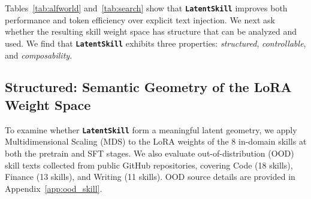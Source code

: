 \documentclass{llmxive}
\providecommand{\textttt}[1]{\texttt{#1}}
\providecommand{\method}{\textbf{\textttt{LatentSkill}}}
\begin{document}

Tables~\ref{tab:alfworld} and~\ref{tab:search} show that \method{} improves both performance and token efficiency over explicit text injection. We next ask whether the resulting skill weight space has structure that can be analyzed and used. We find that \method{} exhibits three properties: \emph{structured}, \emph{controllable}, and \emph{composability}.



\subsection{Structured: Semantic Geometry of the LoRA Weight Space}
To examine whether \method{} form a meaningful latent geometry, we apply Multidimensional Scaling (MDS) to the LoRA weights of the 8 in-domain skills at both the pretrain and SFT stages. We also evaluate out-of-distribution (OOD) skill texts collected from public GitHub repositories, covering Code (18 skills), Finance (13 skills), and Writing (11 skills). OOD source details are provided in Appendix~\ref{app:ood_skill}.
\end{document}
